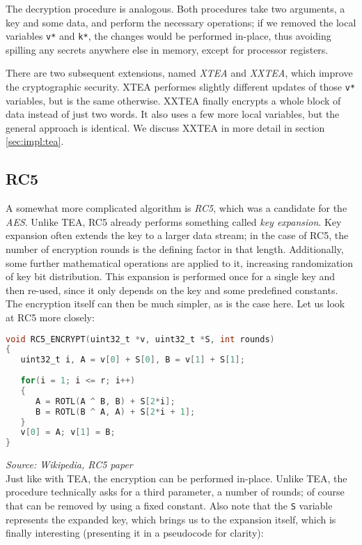 \documentclass[a4paper,10pt,openright]{memoir}
\newcommand{\term}[1]{\textit{#1}}
\newcommand{\code}[1]{\texttt{#1}}
\begin{document}
The decryption procedure is analogous. Both procedures take two 
arguments, a key and some data, and perform the necessary operations; 
if we removed the local variables \code{v*} and \code{k*}, the changes 
would be performed in-place, thus avoiding spilling any secrets 
anywhere else in memory, except for processor registers.

There are two subsequent extensions, named \term{XTEA} and 
\term{XXTEA}, which improve the cryptographic security. XTEA performes 
slightly different updates of those \code{v*} variables, but is the 
same otherwise. XXTEA finally encrypts a whole block of data instead of 
just two words. It also uses a few more local variables, but the 
general approach is identical. We discuss XXTEA in more detail in 
section \ref{sec:impl:tea}.

\subsection{RC5}

A somewhat more complicated algorithm is \term{RC5}, which was a 
candidate for the \term{AES}. Unlike TEA, RC5 already performs 
something called \term{key expansion}. Key expansion often extends the 
key to a larger data stream; in the case of RC5, the number of 
encryption rounds is the defining factor in that length. Additionally, 
some further mathematical operations are applied to it, increasing 
randomization of key bit distribution. This expansion is performed once 
for a single key and then re-used, since it only depends on the key and 
some predefined constants. The encryption itself can then be much 
simpler, as is the case here. Let us look at RC5 more closely:

\begin{lstlisting}[language=C]
void RC5_ENCRYPT(uint32_t *v, uint32_t *S, int rounds)
{
   uint32_t i, A = v[0] + S[0], B = v[1] + S[1];
   
   for(i = 1; i <= r; i++)
   {
      A = ROTL(A ^ B, B) + S[2*i];
      B = ROTL(B ^ A, A) + S[2*i + 1];
   }
   v[0] = A; v[1] = B;
}
\end{lstlisting}
\textit{\footnotesize Source: Wikipedia, RC5 paper}\\

Just like with TEA, the encryption can be performed in-place. Unlike 
TEA, the procedure technically asks for a third parameter, a number of 
rounds; of course that can be removed by using a fixed constant. Also 
note that the \code{S} variable represents the expanded key, which 
brings us to the expansion itself, which is finally interesting 
(presenting it in a pseudocode for clarity):
\end{document}
